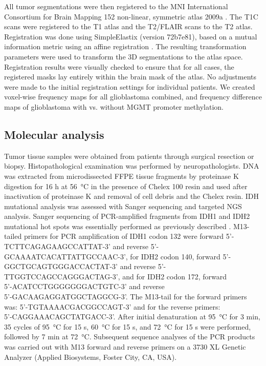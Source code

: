 All tumor segmentations were then registered to the \gls{MNI} International Consortium for Brain Mapping 152 non-linear, symmetric atlas 2009a \autocite{fonov2011unbiased, fonov2009unbiased}.
The \gls{T1C} scans were registered to the \gls{T1} atlas and the \gls{T2}/\gls{FLAIR} scans to the \gls{T2} atlas.
Registration was done using SimpleElastix (version 72b7e81), based on a mutual information metric using an affine registration \autocite{marstal2016simpleelastix}.
The resulting transformation parameters were used to transform the 3D segmentations to the atlas space.
Registration results were visually checked to ensure that for all cases, the registered masks lay entirely within the brain mask of the atlas.
No adjustments were made to the initial registration settings for individual patients.
We created voxel-wise frequency maps for all glioblastoma combined, and frequency difference maps of glioblastoma with vs. without \gls{MGMT} promoter methylation.

\subsection{Molecular analysis}

Tumor tissue samples were obtained from patients through surgical resection or biopsy.
Histopathological examination was performed by neuropathologists.
DNA was extracted from microdissected FFPE tissue fragments by proteinase K digestion for 16 h at \SI{56}{\celsius} in the presence of  Chelex 100 resin and used after inactivation of proteinase K and removal of cell debris and the Chelex resin.
\gls{IDH} mutational analysis was assessed with Sanger sequencing and targeted \gls{NGS} analysis.
Sanger sequencing of PCR-amplified fragments from \gls{IDH}1 and \gls{IDH}2 mutational hot spots was essentially performed as previously described \autocite{vandenbent2013interlaboratory}.
M13-tailed primers for PCR amplification of IDH1 codon 132 were forward {5'-TCTTCAGAGAAGCCATTAT-3'} and reverse {5'-GCAAAATCACATTATTGCCAAC-3'}, for IDH2 codon 140, forward {5'-GGCTGCAGTGGGACCACTAT-3'} and reverse {5'-TTGGTCCAGCCAGGGACTAG-3'}, and for IDH2 codon 172, forward \\ {5'-ACATCCTGGGGGGGACTGTC-3'} and reverse \\{5'-GACAAGAGGATGGCTAGGCG-3'}.
The M13-tail for the forward primers was: {5'-TGTAAAACGACGGCCAGT-3'} and for the reverse primers: \\{5'-CAGGAAACAGCTATGACC-3'}.
After initial denaturation at \SI{95}{\celsius} for 3 min, 35 cycles of \SI{95}{\celsius} for 15 s, \SI{60}{\celsius} for 15 s, and \SI{72}{\celsius} for 15 s were performed, followed by 7 min at \SI{72}{\celsius}.
Subsequent sequence analyses of the PCR products was carried out with M13 forward and reverse primers on a 3730 XL Genetic Analyzer (Applied Biosystems, Foster City, CA, USA).

